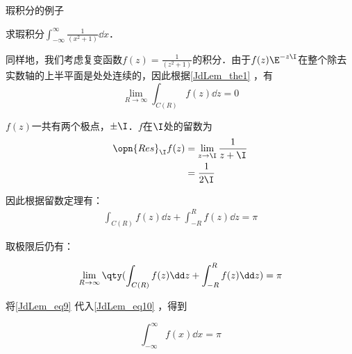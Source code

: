 \begin{example}{瑕积分的例子}

求瑕积分$\int_{-\infty}^\infty \frac{1}{(x^2+1)}\dd x$．

同样地，我们考虑复变函数$f(z)=\frac{1}{(z^2+1)}$的积分．由于$f(z)\E^{-z\I}$在整个除去实数轴的上半平面是处处连续的，因此根据\autoref{JdLem_the1} ，有
\begin{equation}\label{JdLem_eq9}
\lim\limits_{R\to \infty}\int_{C(R)}f(z)\dd z=0
\end{equation}

$f(z)$一共有两个极点，$\pm\I$．$f$在$\I$处的留数为
\begin{equation}
\begin{aligned}
\opn{Res}_\I f(z)&=\lim\limits_{z\to\I}\frac{1}{z+\I}\\
&=\frac{1}{2\I}
\end{aligned}
\end{equation}

因此根据留数定理有：
\begin{equation}\label{JdLem_eq8}
\begin{aligned}
\int_{C(R)}f(z)\dd z+\int_{-R}^R f(z)\dd z=\pi
\end{aligned}
\end{equation}

取极限后仍有：

\begin{equation}\label{JdLem_eq10}
\begin{aligned}
\lim\limits_{R\to \infty}\qty(\int_{C(R)}f(z)\dd z+\int_{-R}^R f(z)\dd z)=\pi
\end{aligned}
\end{equation}

将\autoref{JdLem_eq9} 代入\autoref{JdLem_eq10} ，得到

\begin{equation}
\int^\infty_{-\infty} f(x)\dd x=\pi
\end{equation}



\end{example}





























